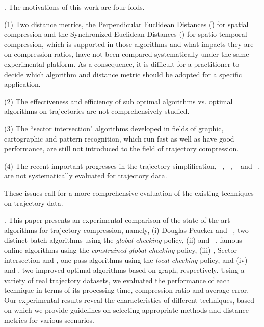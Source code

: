 . The motivations of this work are four folds.

\ni (1) Two distance metrics, \ie the Perpendicular Euclidean Distances (\ped) for spatial compression and the Synchronized Euclidean Distances (\sed)\cite{Meratnia:Spatiotemporal} for spatio-temporal compression, which is supported in those algorithms and what impacts they are on compression ratios, have not been compared systematically under the same experimental platform. As a consequence, it is difficult for a practitioner to decide which algorithm and distance metric should be adopted for a specific application.

\ni (2) The effectiveness and efficiency of sub optimal \lsa algorithms vs. optimal \lsa algorithms on trajectories are not comprehensively studied.

\ni (3) The ``sector intersection" algorithms\cite{Williams:Longest, Sklansky:Cone, Dunham:Cone, Zhao:Sleeve} developed in fields of graphic, cartographic and pattern recognition, which run fast as well as have good performance, are still not introduced to the field of trajectory compression.

\ni (4) The recent important progresses in the trajectory simplification, \ie \squish~\cite{Muckell:Compression}, \bqsa~\cite{Liu:BQS}, \operb~\cite{Lin:Operb} and \cised~\cite{Lin:Cised}, are not systematically evaluated for trajectory data. 




These issues call for a more comprehensive evaluation of the existing \lsa techniques on trajectory data.

\stitle{\textcolor[rgb]{0.00,0.07,1.00}{Contributions \& Roadmap}}.
This paper presents an experimental comparison of the state-of-the-art \lsa algorithms for trajectory compression, namely,
(i) Douglas-Peucker\cite{Douglas:Peucker,Meratnia:Spatiotemporal} and \pavlidis~\cite{Pavlidis:Segment}, two distinct batch \lsa algorithms using the \emph{global checking} policy,
(ii) \bqsa\cite{Liu:BQS} and \squishe~\cite{Muckell:SQUISH}, famous online \lsa algorithms using the \emph{constrained global checking} policy,
(iii) \operb\cite{Lin:Operb}, Sector intersection\cite{Williams:Longest,Sklansky:Cone,Dunham:Cone, Zhao:Sleeve} and \cised \cite{Lin:Cised}, one-pass \lsa algorithms using the \emph{local checking} policy, and
(iv) \oped\cite{Chan:Optimal} and \osed, two improved optimal \lsa algorithms based on graph, respectively.
%
Using a variety of real trajectory datasets, we evaluated the performance of each technique in terms of its processing time, compression ratio and average error.
Our experimental results reveal the characteristics of different techniques, based on which we provide guidelines on selecting appropriate methods and distance metrics for various scenarios.

